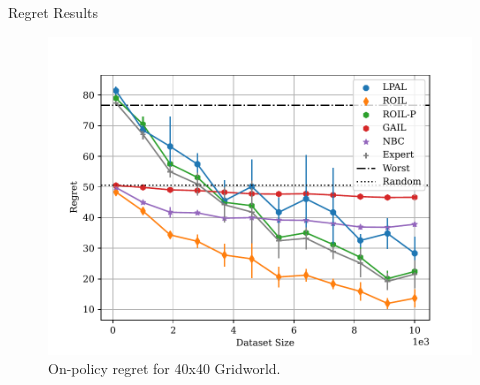 \begin{block}{Regret Results}
    \begin{center}
        \begin{figure}
            \includegraphics[]{../../pres_roil/plots/regrets/40x40_gridworld_on_policy_regret_regrets.pdf}
            \caption{On-policy regret for 40x40 Gridworld.}
        \end{figure}
    \end{center}
\end{block}
